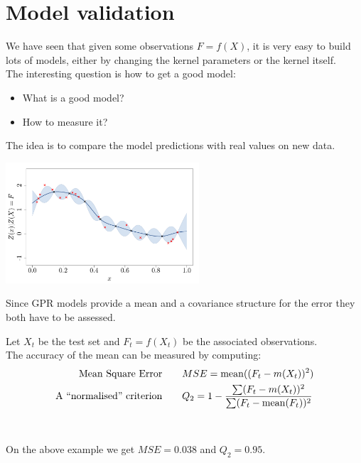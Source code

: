 \documentclass{beamer}
\begin{document}
\section{Model validation}

\begin{frame}{}
We have seen that given some observations $F=f(X)$, it is very easy to build lots of models, either by changing the kernel parameters or the kernel itself.\\ 
\vspace{5mm}
The interesting question is how to get a good model:
\begin{itemize}
  \item What is a good model?
  \item How to measure it?
\end{itemize}
\end{frame}

\begin{frame}{}
The idea is to compare the model predictions with real values on new data. 
\begin{center}
\includegraphics[height=4.5cm]{figures/R/VALID_testset}
\end{center}
\vspace{3mm}
Since GPR models provide a mean and a covariance structure for the error they both have to be assessed.
\end{frame}

\begin{frame}{}
Let $X_t$ be the test set and $F_t=f(X_t)$ be the associated observations.\\ \vspace{5mm}
The accuracy of the mean can be measured by computing: 
\begin{equation*}
  \begin{split}
    \text{Mean Square Error\qquad}& MSE = \mathrm{mean} ((F_t - m(X_t))^2) \\
    \text{A ``normalised'' criterion\qquad}& Q_2 = 1 - \frac{\sum (F_t - m(X_t))^2}{\sum (F_t - \mathrm{mean}(F_t))^2} 
  \end{split}
\end{equation*}
\\ \ \\
On the above example we get $MSE = 0.038$ and $Q_2 = 0.95$.
\end{frame}
\end{document}
